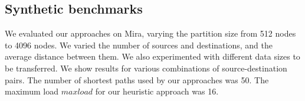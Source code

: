 \subsection{Synthetic benchmarks}
We evaluated our approaches on Mira, varying the partition size from 512 nodes to 4096 nodes. We varied the number of sources and destinations, and the average distance between them. We also experimented with different data sizes to be transferred. We show results for various combinations of source-destination pairs. The number of shortest paths used by our approaches was 50. The maximum load $maxload$ for our heuristic approach was 16. 
